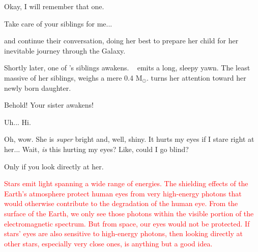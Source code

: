 \documentclass[main.tex]{subfiles}
\begin{document}
\par \Maia Okay, I will remember that one.

\par \Pleione Take care of your siblings for me...

\par \nar \rmmaia and \rmpleione continue their conversation, \rmpleione doing her best to prepare her child for her inevitable journey through the Galaxy.  

\par \nar Shortly later, one of \rmmaia's siblings awakens.  \rmelectra~ emits a long, sleepy yawn.  The least massive of her siblings, \rmelectra weighs a mere 0.4 M$_{\odot}$.  \rmpleione turns her attention toward her newly born daughter.

\par \Pleione Behold!  Your sister awakens!

\par \Electra  Uh... Hi.

\par \Maia Oh, wow.  She is \textit{super} bright and, well, shiny.  It hurts my eyes if I stare right at her... Wait, \textit{is} this hurting my eyes?  Like, could I go blind?

\par \Pleione Only if you look directly at her.

\begin{tcolorbox}[sharp corners, colback=red!30, colframe=red!80!blue, title=Stellar Emission]
\par \textcolor{red} {Stars emit light spanning a wide range of energies.  The shielding effects of the Earth's atmosphere protect human eyes from very high-energy photons that would otherwise contribute to the degradation of the human eye.  From the surface of the Earth, we only see those photons within the visible portion of the electromagnetic spectrum.  But from space, our eyes would not be protected.  If stars' eyes are also sensitive to high-energy photons, then looking directly at other stars, especially very close ones, is anything but a good idea.}
\end{tcolorbox}
\end{document}
